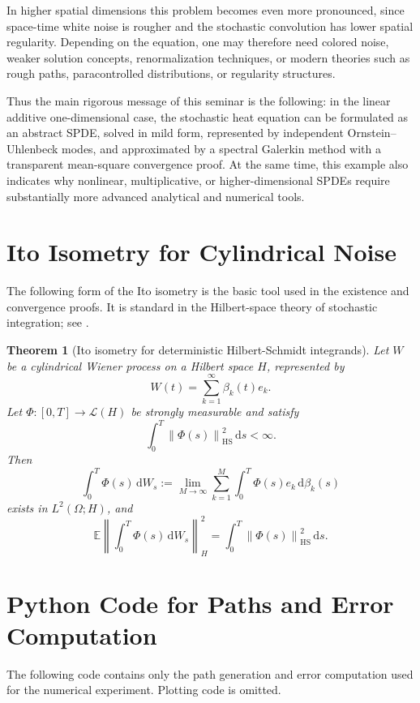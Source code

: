 \documentclass[11pt,a4paper]{article}
\newtheorem{theorem}{Theorem}[section]
\newcommand{\E}{\mathbb{E}}
\newcommand{\dd}{\,\mathrm{d}}
\newcommand{\HS}{\mathrm{HS}}
\newcommand{\norm}[1]{\left\lVert #1 \right\rVert}
\begin{document}
In higher spatial dimensions this problem becomes even more pronounced, since
space-time white noise is rougher and the stochastic convolution has lower
spatial regularity. Depending on the equation, one may therefore need colored
noise, weaker solution concepts, renormalization techniques, or modern theories
such as rough paths, paracontrolled distributions, or regularity structures.

Thus the main rigorous message of this seminar is the following: in the linear
additive one-dimensional case, the stochastic heat equation can be formulated
as an abstract SPDE, solved in mild form, represented by independent
Ornstein--Uhlenbeck modes, and approximated by a spectral Galerkin method with
a transparent mean-square convergence proof. At the same time, this example
also indicates why nonlinear, multiplicative, or higher-dimensional SPDEs
require substantially more advanced analytical and numerical tools.

\appendix

\section{Ito Isometry for Cylindrical Noise}
\label{app:ito-isometry}

The following form of the Ito isometry is the basic tool used in the existence
and convergence proofs. It is standard in the Hilbert-space theory of stochastic
integration; see \cite{delSarto2025,daPratoZabczyk}.

\begin{theorem}[Ito isometry for deterministic Hilbert-Schmidt integrands]
Let \(W\) be a cylindrical Wiener process on a Hilbert space \(H\), represented
by
\[
  W(t)=\sum_{k=1}^{\infty}\beta_k(t)e_k.
\]
Let \(\Phi:[0,T]\to\mathcal L(H)\) be strongly measurable and satisfy
\[
  \int_0^T\norm{\Phi(s)}_{\HS}^2\dd s<\infty.
\]
Then
\[
  \int_0^T\Phi(s)\dd W_s
  :=
  \lim_{M\to\infty}
  \sum_{k=1}^{M}\int_0^T\Phi(s)e_k\dd\beta_k(s)
\]
exists in \(L^2(\Omega;H)\), and
\[
  \E\left\|\int_0^T\Phi(s)\dd W_s\right\|_H^2
  =
  \int_0^T\norm{\Phi(s)}_{\HS}^2\dd s.
\]
\end{theorem}

\section{Python Code for Paths and Error Computation}
\label{app:python-code}

The following code contains only the path generation and error computation used
for the numerical experiment. Plotting code is omitted.
\end{document}
